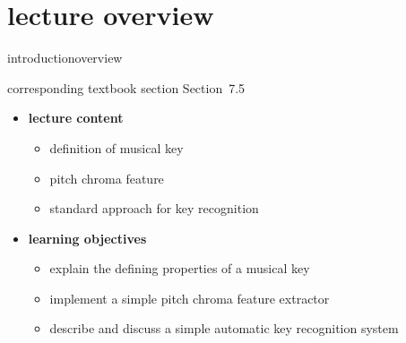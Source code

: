 


\subtitle{Module 7.5: Musical Key Recognition}


	

    \section[overview]{lecture overview}
        \begin{frame}{introduction}{overview}
            \begin{block}{corresponding textbook section}
                    Section~7.5
            \end{block}

            \begin{itemize}
                \item   \textbf{lecture content}
                    \begin{itemize}
                        \item   definition of musical key
                        \item   pitch chroma feature
                        \item   standard approach for key recognition
                    \end{itemize}
                \bigskip
                \item<2->   \textbf{learning objectives}
                    \begin{itemize}
                        \item   explain the defining properties of a musical key
                        \item   implement a simple pitch chroma feature extractor
                        \item   describe and  discuss a simple automatic key recognition system
                    \end{itemize}
            \end{itemize}
        \end{frame}

